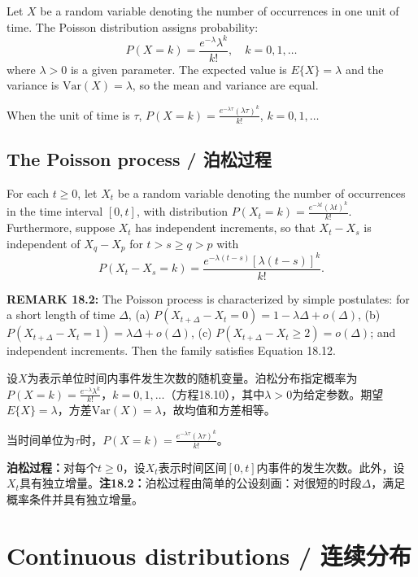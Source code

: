 \begin{original}
Let $X$ be a random variable denoting the number of occurrences in one unit of time. The Poisson distribution assigns probability:
\[
P(X = k) = \frac{e^{-\lambda}\lambda^k}{k!}, \quad k = 0, 1, \ldots \tag{18.10}
\]
where $\lambda > 0$ is a given parameter. The expected value is $E\{X\} = \lambda$ and the variance is $\text{Var}(X) = \lambda$, so the mean and variance are equal.

When the unit of time is $\tau$, $P(X = k) = \frac{e^{-\lambda\tau}(\lambda\tau)^k}{k!}$, $k = 0, 1, \ldots$

\subsection{The Poisson process / 泊松过程}

For each $t \geq 0$, let $X_t$ be a random variable denoting the number of occurrences in the time interval $[0, t]$, with distribution $P(X_t = k) = \frac{e^{-\lambda t}(\lambda t)^k}{k!}$. Furthermore, suppose $X_t$ has independent increments, so that $X_t - X_s$ is independent of $X_q - X_p$ for $t > s \geq q > p$ with
\[
P(X_t - X_s = k) = \frac{e^{-\lambda(t-s)}[\lambda(t-s)]^k}{k!}. \tag{18.12}
\]

\textbf{REMARK 18.2:} The Poisson process is characterized by simple postulates: for a short length of time $\Delta$, (a) $P(X_{t+\Delta} - X_t = 0) = 1 - \lambda\Delta + o(\Delta)$, (b) $P(X_{t+\Delta} - X_t = 1) = \lambda\Delta + o(\Delta)$, (c) $P(X_{t+\Delta} - X_t \geq 2) = o(\Delta)$; and independent increments. Then the family satisfies Equation 18.12.
\end{original}
\begin{translation}
设$X$为表示单位时间内事件发生次数的随机变量。泊松分布指定概率为$P(X = k) = \frac{e^{-\lambda}\lambda^k}{k!}$，$k = 0, 1, \ldots$（方程18.10），其中$\lambda > 0$为给定参数。期望$E\{X\} = \lambda$，方差$\text{Var}(X) = \lambda$，故均值和方差相等。

当时间单位为$\tau$时，$P(X = k) = \frac{e^{-\lambda\tau}(\lambda\tau)^k}{k!}$。

\textbf{泊松过程：}对每个$t \geq 0$，设$X_t$表示时间区间$[0, t]$内事件的发生次数。此外，设$X_t$具有独立增量。\textbf{注18.2：}泊松过程由简单的公设刻画：对很短的时段$\Delta$，满足概率条件并具有独立增量。
\end{translation}
\section{Continuous distributions / 连续分布}


